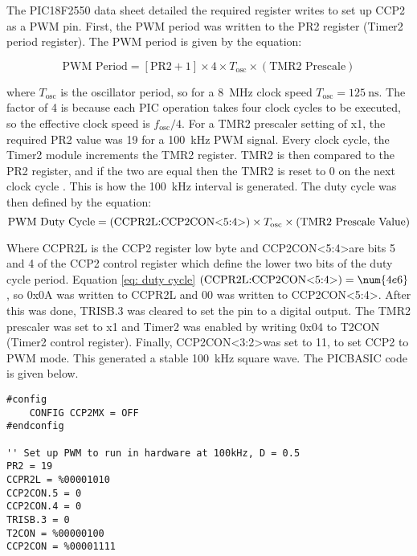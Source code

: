 The PIC18F2550 data sheet \cite{pic18f2550} detailed the required register writes to set up CCP2 as a PWM pin. First, the PWM period was written to the PR2 register (Timer2 period register). The PWM period is given by the equation:

\begin{equation}
\text{PWM Period} = [\text{PR2}+1] \times 4 \times T_\text{osc} \times (\text{TMR2 Prescale})
\end{equation}

where $T_\text{osc}$ is the oscillator period, so for a \SI{8}{\mega\hertz} clock speed $T_\text{osc}=\SI{125}{\nano\second}$. The factor of 4 is because each PIC operation takes four clock cycles to be executed, so the effective clock speed is $f_\text{osc}/4$. For a TMR2 prescaler setting of x1, the required PR2 value was 19 for a \SI{100}{\kilo\hertz} PWM signal. Every clock cycle, the Timer2 module increments the TMR2 register. TMR2 is then compared to the PR2 register, and if the two are equal then the TMR2 is reset to 0 on the next clock cycle \cite{pic18f2550}. This is how the \SI{100}{\kilo\hertz} interval is generated. The duty cycle was then defined by the equation:\\

\begin{equation}
\text{PWM Duty Cycle} = (\text{CCPR2L:CCP2CON\textless5:4\textgreater}) \times T_\text{osc} \times (\text{TMR2 Prescale Value}) \label{eq: duty cycle}
\end{equation}

Where CCPR2L is the CCP2 register low byte and CCP2CON\textless5:4\textgreater are bits 5 and 4 of the CCP2 control register which define the lower two bits of the duty cycle period. Equation \ref{eq: duty cycle} $(\text{CCPR2L:CCP2CON\textless5:4\textgreater}) = \num{4e6}$, so 0x0A was written to CCPR2L and 00 was written to CCP2CON\textless5:4\textgreater. After this was done, TRISB.3 was cleared to set the pin to a digital output. The TMR2 prescaler was set to x1 and Timer2 was enabled by writing 0x04 to T2CON (Timer2 control register). Finally, CCP2CON\textless3:2\textgreater was set to 11, to set CCP2 to PWM mode. This generated a stable \SI{100}{\kilo\hertz} square wave. The PICBASIC code is given below.\\
\begin{lstlisting}
#config
    CONFIG CCP2MX = OFF
#endconfig

'' Set up PWM to run in hardware at 100kHz, D = 0.5
PR2 = 19
CCPR2L = %00001010
CCP2CON.5 = 0
CCP2CON.4 = 0
TRISB.3 = 0
T2CON = %00000100
CCP2CON = %00001111
\end{lstlisting}




